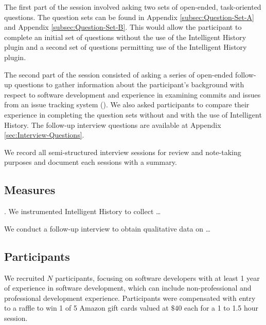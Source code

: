 The first part of the session involved asking two sets of open-ended, task-oriented questions.
The question sets can be found in Appendix \ref{subsec:Question-Set-A} and Appendix \ref{subsec:Question-Set-B}.
This would allow the participant to complete an initial set of questions without the use of the Intelligent History plugin and a second set of questions permitting use of the Intelligent History plugin.

The second part of the session consisted of asking a series of open-ended follow-up questions to gather information about the participant's background with respect to software development and experience in examining commits and issues from an issue tracking system ().
We also asked participants to compare their experience in completing the question sets without and with the use of Intelligent History.
The follow-up interview questions are available at Appendix \ref{sec:Interview-Questions}.

We record all semi-structured interview sessions for review and note-taking purposes and document each sessions with a summary. 

\subsection{Measures}

. We instrumented Intelligent History to collect \dots

 We conduct a follow-up interview to obtain qualitative data on \dots

\subsection{Participants}

We recruited $N$ participants, focusing on software developers with at least 1 year of experience in software development, which can include non-professional and professional development experience.
Participants were compensated with entry to a raffle to win 1 of 5 Amazon gift cards valued at $\$40$  each for a 1 to 1.5 hour session.

